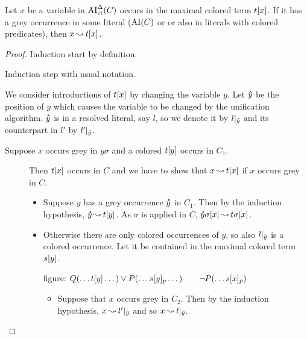 \documentclass[,%
	paper=a4,%
	DIV10, %
	twoside=false,%
	liststotoc,
	bibtotoc,
	draft=false,%
	numbers=noendperiod
]{scrartcl}
\begin{document}



\begin{lemma}
	\label{lemma:arrow_from_grey_to_colored}
	Let $x$ be a variable in $\operatorname{AI}_\mathrm{cl}^\Delta(C)$ occurs in the maximal colored term $t[x]$.
	If it has a grey occurrence in some literal ($\operatorname{AI}(C)$ or or also in literals with colored predicates), then $x\operatorname{\leadsto} t[x]$.
\end{lemma}
\begin{proof}
	Induction start by definition.

	Induction step with usual notation.

	We consider introductions of $t[x]$ by changing the variable $y$.
	Let $\bm\hat y$ be the position of $y$ which causes the variable to be changed by the unification algorithm.
	$\bm\hat y$ is in a resolved literal, say $l$, so we denote it by $l|_{\bm\hat y}$ and its counterpart in $l'$ by $l'|_{\bm\hat y}$. 

	\begin{description}
		\item[Suppose $x$ occurs grey in $y\sigma$ and a colored $t[y]$ occurs in $C_1$.]
			Then $t[x]$ occurs in $C$ and we have to show that $x\operatorname{\leadsto} t[x]$ if $x$ occurs grey in $C$.

			\begin{itemize}
				\item Suppose $y$ has a grey occurrence $\bm\dot y$ in $C_1$.
					Then by the induction hypothesis, $\bm\dot y\operatorname{\leadsto} t[y]$. 
					As $\sigma$ is applied in $C$, $\bm\dot y\sigma[x]\operatorname{\leadsto} t\sigma[x]$.

				\item Otherwise there are only colored occurrences of $y$, so also $l|_{\bm\hat y}$ is a colored occurrence. Let it be contained in the maximal colored term $s[y]$.

					figure: $Q(\dots t[y] \dots) \lor P(\dots s{[y]_{p}} \dots)\quad\quad \lnot P(\dots s{[x]_{p}})$

					\begin{itemize}
						\item Suppose that $x$ occurs grey in $C_2$. Then by the induction hypothesis, $x\operatorname{\leadsto} l'|_{\bm\hat y}$ and so
							$x\operatorname{\leadsto} l|_{\bm\hat y}$.


\end{itemize}
\end{itemize}
\end{description}
\end{proof}
\end{document}

